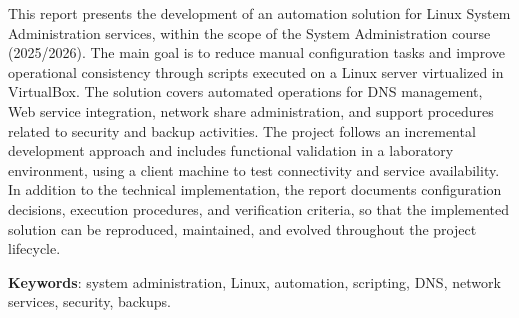 

This report presents the development of an automation solution for Linux System Administration services, within the scope of the System Administration course (2025/2026). The main goal is to reduce manual configuration tasks and improve operational consistency through scripts executed on a Linux server virtualized in VirtualBox. The solution covers automated operations for DNS management, Web service integration, network share administration, and support procedures related to security and backup activities. The project follows an incremental development approach and includes functional validation in a laboratory environment, using a client machine to test connectivity and service availability. In addition to the technical implementation, the report documents configuration decisions, execution procedures, and verification criteria, so that the implemented solution can be reproduced, maintained, and evolved throughout the project lifecycle.

\textbf{Keywords}: system administration, Linux, automation, scripting, DNS, network services, security, backups.
